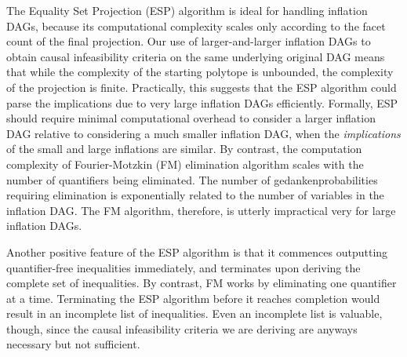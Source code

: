 The Equality Set Projection (ESP) algorithm \cite{jones2004equality,JonesThesis2005} is ideal for handling inflation DAGs, because its computational complexity scales only according to the facet count of the final projection. Our use of larger-and-larger inflation DAGs to obtain causal infeasibility criteria on the same underlying original DAG means that while the complexity of the starting polytope is unbounded, the complexity of the projection is finite. Practically, this suggests that the ESP algorithm could parse the implications due to very large inflation DAGs efficiently. Formally, ESP should require minimal computational overhead to consider a larger inflation DAG relative to considering a much smaller inflation DAG, when the \emph{implications} of the small and large inflations are similar. By contrast, the computation complexity of Fourier-Motzkin (FM) elimination algorithm scales with the number of quantifiers being eliminated. The number of gedankenprobabilities requiring elimination is exponentially related to the number of variables in the inflation DAG. The FM algorithm, therefore, is utterly impractical very for large inflation DAGs.

Another positive feature of the ESP algorithm is that it commences outputting quantifier-free inequalities immediately, and terminates upon deriving the complete set of inequalities. By contrast, FM works by eliminating one quantifier at a time. Terminating the ESP algorithm before it reaches completion would result in an incomplete list of inequalities. Even an incomplete list is valuable, though, since the causal infeasibility criteria we are deriving are anyways necessary but not sufficient.


